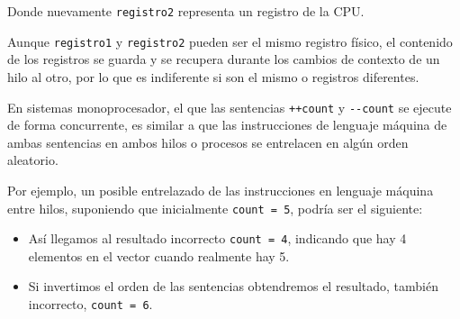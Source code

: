 Donde nuevamente \texttt{registro2} representa un registro de la CPU.

Aunque \texttt{registro1} y \texttt{registro2} pueden ser el mismo
registro físico, el contenido de los registros se guarda y se recupera
durante los cambios de contexto de un hilo al otro, por lo que es
indiferente si son el mismo o registros diferentes.

En sistemas monoprocesador, el que las sentencias \texttt{++count} y
\texttt{-\/-count} se ejecute de forma concurrente, es similar a que las
instrucciones de lenguaje máquina de ambas sentencias en ambos hilos o
procesos se entrelacen en algún orden aleatorio.

Por ejemplo, un posible entrelazado de las instrucciones en lenguaje
máquina entre hilos, suponiendo que inicialmente \texttt{count\ =\ 5},
podría ser el siguiente:

\begin{Shaded}
\begin{Highlighting}[]
\OperatorTok{=} \OperatorTok{[}\OperatorTok{];}        
\OperatorTok{=}\OperatorTok{+} \OperatorTok{;}  
\OperatorTok{=} \OperatorTok{[}\OperatorTok{];}        
\OperatorTok{=}\OperatorTok{{-}} \OperatorTok{;}  
\OperatorTok{[}\OperatorTok{]} \OperatorTok{=}\OperatorTok{;}        
\OperatorTok{[}\OperatorTok{]} \OperatorTok{=}\OperatorTok{;}        
\end{Highlighting}
\end{Shaded}

\begin{itemize}
\item
  Así llegamos al resultado incorrecto \texttt{count\ =\ 4}, indicando
  que hay 4 elementos en el vector cuando realmente hay 5.
\item
  Si invertimos el orden de las sentencias obtendremos el resultado,
  también incorrecto, \texttt{count\ =\ 6}.
\end{itemize}

